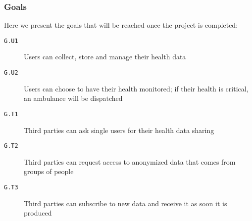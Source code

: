      \subsubsection{Goals}
      \label{sec:goals}

        Here we present the goals that will be reached once the project is completed:

        \begin{description}
          \item[\texttt{G.U1}] Users can collect, store and manage their health data
          \item[\texttt{G.U2}] Users can choose to have their health monitored; if their health is critical, an ambulance will be dispatched
          \item[\texttt{G.T1}] Third parties can ask single users for their health data sharing
          \item[\texttt{G.T2}] Third parties can request access to anonymized data that comes from groups of people
          \item[\texttt{G.T3}] Third parties can subscribe to new data and receive it as soon it is produced
        \end{description}


